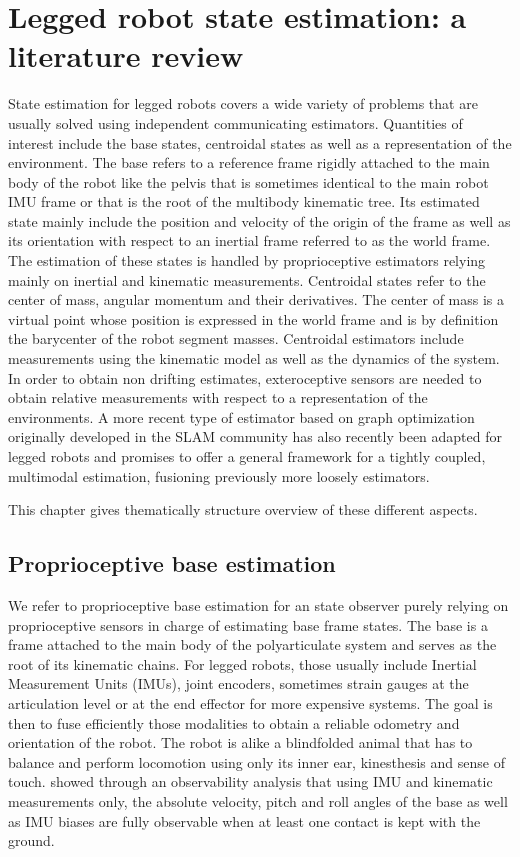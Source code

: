 \chapter{Legged robot state estimation: a literature review}
State estimation for legged robots covers a wide variety of problems that are usually solved using independent communicating estimators.
Quantities of interest include the base states, centroidal states as well as a representation of the environment. The base refers to a reference
frame rigidly attached to the main body of the robot like the pelvis that is sometimes identical to the main robot IMU frame or that is the 
root of the multibody kinematic tree. Its estimated state mainly include the position and velocity of the origin of the frame as well as its orientation
with respect to an inertial frame referred to as the world frame. The estimation of these states is handled by proprioceptive estimators relying 
mainly on inertial and kinematic measurements. Centroidal states refer to the center of mass, angular momentum and their derivatives. The center 
of mass is a virtual point whose position is expressed in the world frame and is by definition the barycenter of the robot segment masses. Centroidal
estimators include measurements using the kinematic model as well as the dynamics of the system. In order to obtain non drifting estimates,
exteroceptive sensors are needed to obtain relative measurements with respect to a representation of the environments. A more recent type of estimator
based on graph optimization originally developed in the SLAM community has also recently been adapted for legged robots and promises to offer a general
framework for a tightly coupled, multimodal estimation, fusioning previously more loosely estimators. 

This chapter gives thematically structure overview of these different aspects. 



\section{Proprioceptive base estimation}
We refer to proprioceptive base estimation for an state observer purely relying on proprioceptive sensors in charge of 
estimating base frame states. The base is a frame attached to the main body of the polyarticulate system and serves
as the root of its kinematic chains. For legged robots, those usually include Inertial Measurement Units (IMUs), joint encoders, sometimes strain gauges at the 
articulation level or at the end effector for more expensive systems. The goal is then to fuse efficiently those 
modalities to obtain a reliable odometry and orientation of the robot. The robot is alike a blindfolded animal that has to balance and perform locomotion using 
only its inner ear, kinesthesis and sense of touch. \cite{bloesch2013state,rotella2014state} showed through an observability analysis that using IMU and kinematic measurements 
only, the absolute velocity, pitch and roll angles of the base as well as IMU biases are fully observable when at least one contact 
is kept with the ground.

